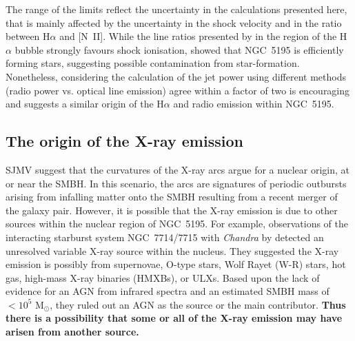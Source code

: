 \documentclass[fleqn,usenatbib]{mnras}
\begin{document}
{The range of the limits reflect the uncertainty in the calculations presented here, that is mainly affected by the uncertainty in the shock velocity and in the ratio between H$\alpha$ and [N~II]. While the line ratios 
presented by \cite{Hoopes-Walterbos} in the region of the H$\alpha$ bubble strongly favours shock ionisation, 
\cite{Alataloetal2016} showed that NGC~5195 is efficiently forming stars, suggesting possible contamination 
from star-formation. Nonetheless, considering the calculation of the jet power using different methods (radio 
power vs. optical line 
emission) agree within a factor of two is encouraging and suggests a similar origin of the H$\alpha$ and 
radio emission within NGC~5195.}




\subsection{The origin of the X-ray emission}
\label{sec:xrays_orign}

SJMV suggest that the curvatures of the X-ray arcs argue for a nuclear origin, at or near the SMBH. In this 
scenario, the arcs are signatures of periodic outbursts arising from infalling matter onto the SMBH 
resulting from a recent merger of the galaxy pair. However, it is possible that the X-ray emission is due 
to other sources within the nuclear region of NGC~5195. 
For example, observations of the interacting starburst system NGC~7714/7715 with \textit{Chandra} by 
\cite{SSN2005} detected an unresolved variable X-ray source within the nucleus. They suggested the X-ray 
emission is possibly from supernovae, O-type stars, Wolf Rayet (W-R) stars,
hot gas, high-mass X-ray binaries (HMXBs), or ULXs. Based upon the lack of evidence for an AGN from 
infrared spectra and an estimated SMBH mass of $< 10^{5}$ M$_{\odot}$, they ruled out an AGN as the source 
or the main contributor. \textbf{Thus there is a  possibility 
that some or all of the X-ray emission may have arisen from another source. }
\end{document}
